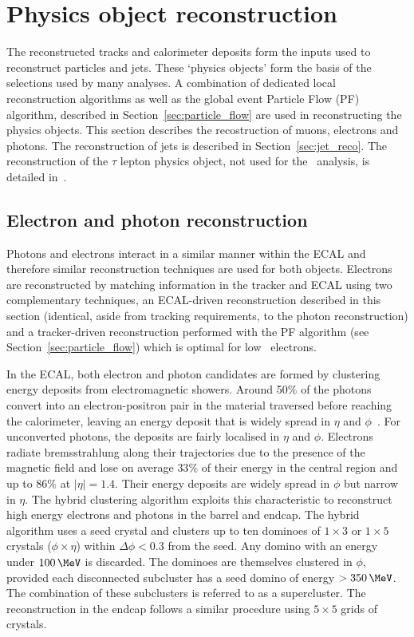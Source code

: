 \section{Physics object reconstruction}

The reconstructed tracks and calorimeter deposits form 
the inputs used to reconstruct particles and jets. These `physics objects'
form the basis of the selections used by many analyses. A combination 
of dedicated local reconstruction algorithms as well as the global event Particle
Flow (PF) algorithm, described in Section~\ref{sec:particle_flow} are used in 
reconstructing the physics objects. This section describes the recostruction
of muons, electrons and photons. The reconstruction of jets
is described in Section~\ref{sec:jet_reco}. The reconstruction of
the $\tau$ lepton physics object, not used for the \alphat~analysis, is 
detailed in~\cite{Khachatryan:2062435}.


\subsection{Electron and photon reconstruction}
\label{sec:ele_pho_reco}

Photons and electrons interact in a similar manner within the ECAL and therefore similar reconstruction techniques
are used for both objects. Electrons are reconstructed by matching 
information in the tracker and ECAL using two complementary techniques, an ECAL-driven 
reconstruction described in this section (identical, aside from tracking
requirements, to the photon reconstruction) and a tracker-driven reconstruction performed with
the PF algorithm (see Section~\ref{sec:particle_flow}) which is optimal for low \pt~electrons. 

In the ECAL, both electron and photon candidates are formed by clustering energy deposits
from electromagnetic showers. Around 50\% of the photons convert into an electron-positron 
pair in the material traversed before reaching the calorimeter, leaving an energy deposit that is widely 
spread in $\eta$ and $\phi$~\cite{Argiro:2010zz}.  For unconverted photons, the 
deposits are fairly localised in $\eta$ and $\phi$. Electrons radiate
bremsstrahlung along their trajectories due to the presence of the magnetic field and 
lose on average $33\%$ of their energy in the central region 
and up to $86\%$ at $|\eta| = 1.4$. Their energy deposits are widely spread in $\phi$ but narrow in $\eta$. 
The hybrid clustering algorithm exploits this characteristic to
reconstruct high energy electrons and photons in the barrel and endcap. The hybrid algorithm
uses a seed crystal and clusters up to ten dominoes of $1\times3$ or $1\times5$ crystals ($\phi\times\eta$) within 
$\Delta\phi < 0.3$ from the seed. Any domino with an energy under $100\,\MeV$ is discarded. The dominoes
are themselves clustered in $\phi$, provided each disconnected subcluster has a seed 
domino of energy $>350\,\MeV$. The combination of these subclusters is referred 
to as a supercluster. The reconstruction in the endcap follows a similar procedure 
using $5\times5$ grids of crystals. 

